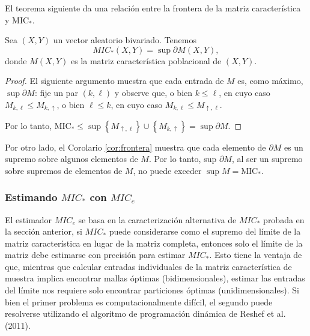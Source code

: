         El teorema siguiente da una relaci\'on entre la frontera de la matriz caracter\'istica y $\mathrm{MIC}_*$.
        
        
        \begin{thm}
            Sea $(X, Y)$ un vector aleatorio bivariado. Tenemos
            $$
            M I C_*(X, Y)=\sup \partial M(X, Y),
            $$
            donde $M(X, Y)$ es la matriz caracter\'istica poblacional de $(X, Y)$.
        \end{thm}
    
    
        \begin{proof}
            El siguiente argumento muestra que cada entrada de $M$ es, como m\'aximo, $\sup \partial M$: fije un par $(k, \ell)$ y observe que, o bien $k \leq \ell$, en cuyo caso $M_{k, \ell} \leq M_{k, \uparrow}$, o bien $\ell \leq k$, en cuyo caso $M_{k, \ell} \leq M_{\uparrow, \ell}$. 
            
            Por lo tanto, $\mathrm{MIC}_* \leq \sup \left\{M_{\uparrow, \ell}\right\} \cup\left\{M_{k, \uparrow}\right\}=\sup \partial M$.
        \end{proof}
        
        Por otro lado, el Corolario \ref{cor:frontera} muestra que cada elemento de $\partial M$ es un supremo sobre algunos elementos de $M$. Por lo tanto, sup $\partial M$, al ser un supremo sobre supremos de elementos de $M$, no puede exceder $\sup M=\mathrm{MIC}_*$.
    
    
        \subsubsection[Estimando el MIC* con MICe]{Estimando $MIC_*$ con $MIC_e$}
    
    
        El estimador $MIC_e$ se basa en la caracterizaci\'on alternativa de $MIC_*$ probada en la secci\'on anterior, si $MIC_*$ puede considerarse como el supremo del l\'imite de la matriz caracter\'istica en lugar de la matriz completa, entonces solo el l\'imite de la matriz debe estimarse con precisi\'on para estimar $MIC_*$. Esto tiene la ventaja de que, mientras que calcular entradas individuales de la matriz caracter\'istica de muestra implica encontrar mallas \'optimas (bidimensionales), estimar las entradas del l\'imite nos requiere solo encontrar particiones \'optimas (unidimensionales). Si bien el primer problema es computacionalmente dif\'icil, el segundo puede resolverse utilizando el algoritmo de programaci\'on din\'amica de Reshef et al.(2011)\cite{Reshef2011}.
    
